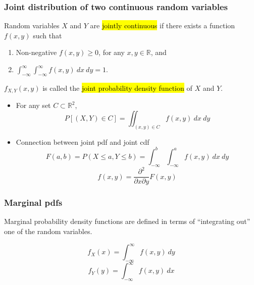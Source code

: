 \documentclass[slidestop,compress,mathserif]{beamer}
\begin{document}
\begin{frame}
\frametitle{Joint distribution of two continuous random variables}

\vspace{-0.2cm}
\begin{defn}
Random variables $X$ and $Y$ are \hl{jointly continuous} if there exists a function $f(x, y)$ such that
\begin{enumerate}
\item Non-negative $f(x, y) \geq 0$, for any $x, y \in \mathbb{R}$, and
\item $\int_{-\infty}^{\infty} \int_{-\infty}^{\infty} f(x,y) ~dx~dy = 1$.
\end{enumerate}
$f_{X, Y}(x, y)$ is called the \hl{joint probability density function} of $X$ and $Y$.
\end{defn}
\vspace{-0.2cm}

\begin{itemize}
\item 
For any set $C \subset \mathbb{R}^2$,
\[ P[(X, Y) \in C] = \iint_{(x, y) \in C} f(x,y) ~dx~dy\]
\vspace{-0.2cm}
\item 
Connection between joint pdf and joint cdf
\vspace{-0.2cm}
\[ F(a,b) = P(X\leq a,Y\leq b) = \int_{-\infty}^b \int_{-\infty}^a f(x,y) ~dx~dy \] \vspace{-0.2cm}
\[f(x,y) = \frac{\partial^2}{\partial x \partial y} F(x,y)\]

\end{itemize}


\end{frame}


\begin{frame}
\frametitle{Marginal pdfs}

Marginal probability density functions are defined in terms of ``integrating out'' one of the random variables.

\[ f_X(x) = \int_{-\infty}^\infty f(x,y)~dy \]
\[ f_Y(y) = \int_{-\infty}^\infty f(x,y)~dx \]


\end{frame}
\end{document}

